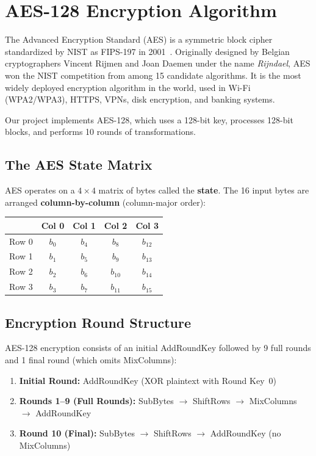 \documentclass[12pt,a4paper]{article}
\begin{document}
\section{AES-128 Encryption Algorithm}

The Advanced Encryption Standard (AES) is a symmetric block cipher standardized by NIST as FIPS-197 in 2001~\cite{fips197}. Originally designed by Belgian cryptographers Vincent Rijmen and Joan Daemen under the name \textit{Rijndael}, AES won the NIST competition from among 15 candidate algorithms. It is the most widely deployed encryption algorithm in the world, used in Wi-Fi (WPA2/WPA3), HTTPS, VPNs, disk encryption, and banking systems.

Our project implements AES-128, which uses a 128-bit key, processes 128-bit blocks, and performs 10 rounds of transformations.

\subsection{The AES State Matrix}

AES operates on a $4 \times 4$ matrix of bytes called the \textbf{state}. The 16 input bytes are arranged \textbf{column-by-column} (column-major order):

\begin{center}
\begin{tabular}{c|cccc}
 & Col 0 & Col 1 & Col 2 & Col 3 \\ \hline
Row 0 & $b_0$ & $b_4$ & $b_8$ & $b_{12}$ \\
Row 1 & $b_1$ & $b_5$ & $b_9$ & $b_{13}$ \\
Row 2 & $b_2$ & $b_6$ & $b_{10}$ & $b_{14}$ \\
Row 3 & $b_3$ & $b_7$ & $b_{11}$ & $b_{15}$ \\
\end{tabular}
\end{center}

\subsection{Encryption Round Structure}

AES-128 encryption consists of an initial AddRoundKey followed by 9 full rounds and 1 final round (which omits MixColumns):

\begin{enumerate}
    \item \textbf{Initial Round:} AddRoundKey (XOR plaintext with Round Key~0)
    \item \textbf{Rounds 1--9 (Full Rounds):} SubBytes $\to$ ShiftRows $\to$ MixColumns $\to$ AddRoundKey
    \item \textbf{Round 10 (Final):} SubBytes $\to$ ShiftRows $\to$ AddRoundKey (no MixColumns)
\end{enumerate}
\end{document}
